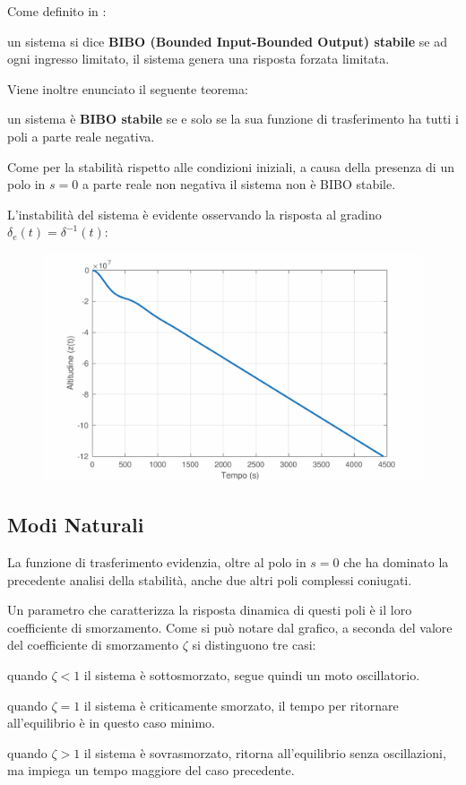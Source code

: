 Come definito in \cite{zampieri_dispensa_controlli}:
\begin{sitemize}
    \item un sistema si dice \textbf{BIBO (Bounded Input-Bounded Output) stabile} se ad ogni ingresso limitato, il sistema genera una risposta forzata limitata.
\end{sitemize}

Viene inoltre enunciato il seguente teorema:
\begin{sitemize}
    \item un sistema è \textbf{BIBO stabile} se e solo se la sua funzione di trasferimento ha tutti i poli a parte reale negativa.
\end{sitemize}

Come per la stabilità rispetto alle condizioni iniziali, a causa della presenza di un polo in $s = 0$ a parte reale non negativa il sistema non è BIBO stabile.

L'instabilità del sistema è evidente osservando la risposta al gradino $\delta_e(t) = \delta^{-1}(t)$:

\begin{figure}[H]
    \centering
    \includegraphics[width=0.65\linewidth]{Immagini/BIBO_instabile.pdf}
\end{figure}

\subsection{Modi Naturali}

La funzione di trasferimento evidenzia, oltre al polo in $s = 0$ che ha dominato la precedente analisi della stabilità, anche due altri poli complessi coniugati.

Un parametro che caratterizza la risposta dinamica di questi poli è il loro coefficiente di smorzamento.
Come si può notare dal grafico, a seconda del valore del coefficiente di smorzamento $\zeta$ si distinguono tre casi:
\begin{sitemize}
    \item quando $\zeta < 1$ il sistema è sottosmorzato, segue quindi un moto oscillatorio.
    \item quando $\zeta = 1$ il sistema è criticamente smorzato, il tempo per ritornare all'equilibrio è in questo caso minimo.
    \item quando $\zeta > 1$ il sistema è sovrasmorzato, ritorna all'equilibrio senza oscillazioni, ma impiega un tempo maggiore del caso precedente.
\end{sitemize}

